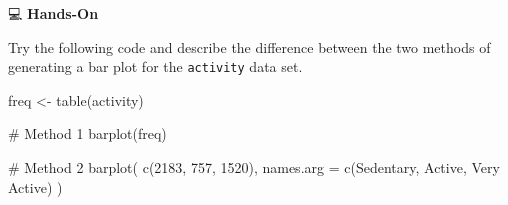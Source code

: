 \documentclass[
  letterpaper,
  DIV=11,
  numbers=noendperiod]{scrreprt}
\newenvironment{Shaded}{\begin{snugshade}}{\end{snugshade}}
\newcommand{\AttributeTok}[1]{\textcolor[rgb]{0.40,0.45,0.13}{#1}}
\newcommand{\CommentTok}[1]{\textcolor[rgb]{0.37,0.37,0.37}{#1}}
\newcommand{\DecValTok}[1]{\textcolor[rgb]{0.68,0.00,0.00}{#1}}
\newcommand{\FunctionTok}[1]{\textcolor[rgb]{0.28,0.35,0.67}{#1}}
\newcommand{\NormalTok}[1]{\textcolor[rgb]{0.00,0.23,0.31}{#1}}
\newcommand{\OtherTok}[1]{\textcolor[rgb]{0.00,0.23,0.31}{#1}}
\newcommand{\StringTok}[1]{\textcolor[rgb]{0.13,0.47,0.30}{#1}}
\begin{document}
💻 \textbf{Hands-On}

Try the following code and describe the difference between the two
methods of generating a bar plot for the \texttt{activity} data set.

\begin{Shaded}
\begin{Highlighting}[]
\NormalTok{freq }\OtherTok{\textless{}{-}} \FunctionTok{table}\NormalTok{(activity)}

\CommentTok{\# Method 1}
\FunctionTok{barplot}\NormalTok{(freq)}

\CommentTok{\# Method 2}
\FunctionTok{barplot}\NormalTok{(}
  \FunctionTok{c}\NormalTok{(}\DecValTok{2183}\NormalTok{, }\DecValTok{757}\NormalTok{, }\DecValTok{1520}\NormalTok{), }
  \AttributeTok{names.arg =} \FunctionTok{c}\NormalTok{(}\StringTok{\textquotesingle{}Sedentary\textquotesingle{}}\NormalTok{, }\StringTok{\textquotesingle{}Active\textquotesingle{}}\NormalTok{, }\StringTok{\textquotesingle{}Very Active\textquotesingle{}}\NormalTok{)}
\NormalTok{)  }
\end{Highlighting}
\end{Shaded}
\end{document}
